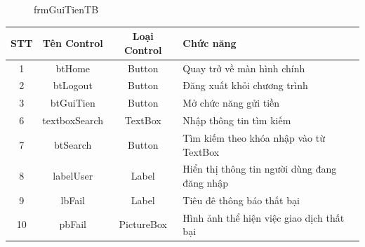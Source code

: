 \documentclass{article}
\begin{document}
\begin{enumerate}
\begin{itemize}
					\begin{figure}[!h]
						\setlength\fboxsep{1pt}
						\setlength\fboxrule{1pt}
						\caption{frmGuiTienTB}
						\label{fig:frmGuiTienTB}
					\end{figure}
					
					\begin{tabular}{|c|c|c| p{5cm}|}
						
						\hline
						STT & Tên Control & Loại Control & Chức năng \\
						\hline
						1 & btHome & Button & Quay trở về màn hình chính\\
						\hline
						2 & btLogout & Button & Đăng xuất khỏi chương trình \\
						\hline
						3 & btGuiTien & Button & Mở chức năng gửi tiền \\
						\hline
						6 & textboxSearch & TextBox & Nhập thông tin tìm kiếm \\
						\hline
						7 & btSearch & Button & Tìm kiếm theo khóa nhập vào từ TextBox\\
						\hline
						8 & labelUser & Label & Hiển thị thông tin người dùng đang đăng nhập\\						
						\hline
						9 & lbFail & Label & Tiêu đê thông báo thất bại\\
						\hline
						10 & pbFail & PictureBox & Hình ảnh thể hiện việc giao dịch thất bại\\
						\hline						
					\end{tabular}
					

\end{itemize}
\end{enumerate}
\end{document}
